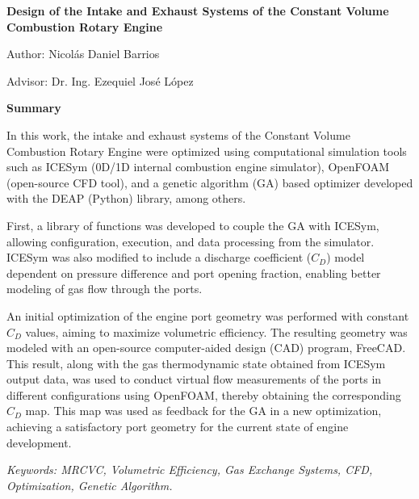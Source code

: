 \documentclass[oneside,a4paper,spanish,links,11pt]{book}
\begin{document}
\newpage
\thispagestyle{plain}
\begin{center}
\large{\textbf{{Design of the Intake and Exhaust Systems of the Constant Volume Combustion Rotary Engine}}}

\end{center}

\normalsize{

\hfill Author: Nicolás Daniel Barrios

\hfill Advisor: Dr. Ing. Ezequiel José López


\textbf{Summary}

In this work, the intake and exhaust systems of the Constant Volume Combustion
Rotary Engine were optimized using computational simulation tools such
as ICESym (0D/1D internal combustion engine simulator), OpenFOAM (open-source
CFD tool), and a genetic algorithm (GA) based optimizer developed with the DEAP
(Python) library, among others.

First, a library of functions was developed to couple the GA with ICESym,
allowing configuration, execution, and data processing from the simulator.
%
ICESym was also modified to include a discharge coefficient ($C_{D}$) model
dependent on pressure difference and port opening fraction, enabling better
modeling of gas flow through the ports.

An initial optimization of the engine port geometry was performed with constant
$C_{D}$ values, aiming to maximize volumetric efficiency.
%
The resulting geometry was modeled with an open-source computer-aided design
(CAD) program, FreeCAD.
%
This result, along with the gas thermodynamic state obtained from ICESym output
data, was used to conduct virtual flow measurements of the ports in different
configurations using OpenFOAM, thereby obtaining the corresponding $C_{D}$ map.
%
This map was used as feedback for the GA in a new optimization, achieving a
satisfactory port geometry for the current state of engine development.


\textit{Keywords: MRCVC, Volumetric Efficiency, Gas Exchange Systems, CFD, Optimization, Genetic Algorithm.}

\newpage

\lhead{}
\rhead{\thepage}



}
\end{document}
